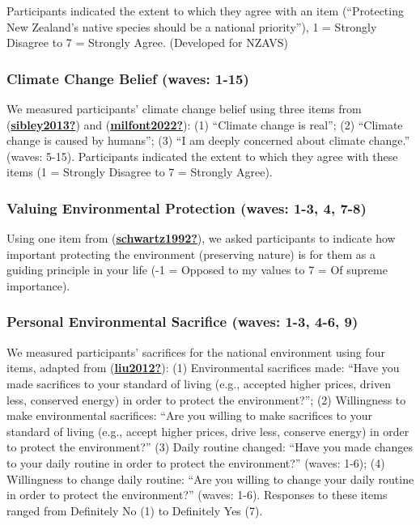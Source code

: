 \documentclass[
  singlecolumn]{report}
\begin{document}
Participants indicated the extent to which they agree with an item
(``Protecting New Zealand's native species should be a national
priority''), 1 = Strongly Disagree to 7 = Strongly Agree. (Developed for
NZAVS)

\hypertarget{climate-change-belief-waves-1-15}{%
\subsubsection{Climate Change Belief (waves:
1-15)}\label{climate-change-belief-waves-1-15}}

We measured participants' climate change belief using three items from
(\protect\hyperlink{ref-sibley2013}{\textbf{sibley2013?}}) and
(\protect\hyperlink{ref-milfont2022}{\textbf{milfont2022?}}): (1)
``Climate change is real''; (2) ``Climate change is caused by humans'';
(3) ``I am deeply concerned about climate change.'' (waves: 5-15).
Participants indicated the extent to which they agree with these items
(1 = Strongly Disagree to 7 = Strongly Agree).

\hypertarget{valuing-environmental-protection-waves-1-3-4-7-8}{%
\subsubsection{Valuing Environmental Protection (waves: 1-3, 4,
7-8)}\label{valuing-environmental-protection-waves-1-3-4-7-8}}

Using one item from
(\protect\hyperlink{ref-schwartz1992}{\textbf{schwartz1992?}}), we asked
participants to indicate how important protecting the environment
(preserving nature) is for them as a guiding principle in your life (-1
= Opposed to my values to 7 = Of supreme importance).

\hypertarget{personal-environmental-sacrifice-waves-1-3-4-6-9}{%
\subsubsection{Personal Environmental Sacrifice (waves: 1-3, 4-6,
9)}\label{personal-environmental-sacrifice-waves-1-3-4-6-9}}

We measured participants' sacrifices for the national environment using
four items, adapted from
(\protect\hyperlink{ref-liu2012}{\textbf{liu2012?}}): (1) Environmental
sacrifices made: ``Have you made sacrifices to your standard of living
(e.g., accepted higher prices, driven less, conserved energy) in order
to protect the environment?''; (2) Willingness to make environmental
sacrifices: ``Are you willing to make sacrifices to your standard of
living (e.g., accept higher prices, drive less, conserve energy) in
order to protect the environment?'' (3) Daily routine changed: ``Have
you made changes to your daily routine in order to protect the
environment?'' (waves: 1-6); (4) Willingness to change daily routine:
``Are you willing to change your daily routine in order to protect the
environment?'' (waves: 1-6). Responses to these items ranged from
Definitely No (1) to Definitely Yes (7).
\end{document}
